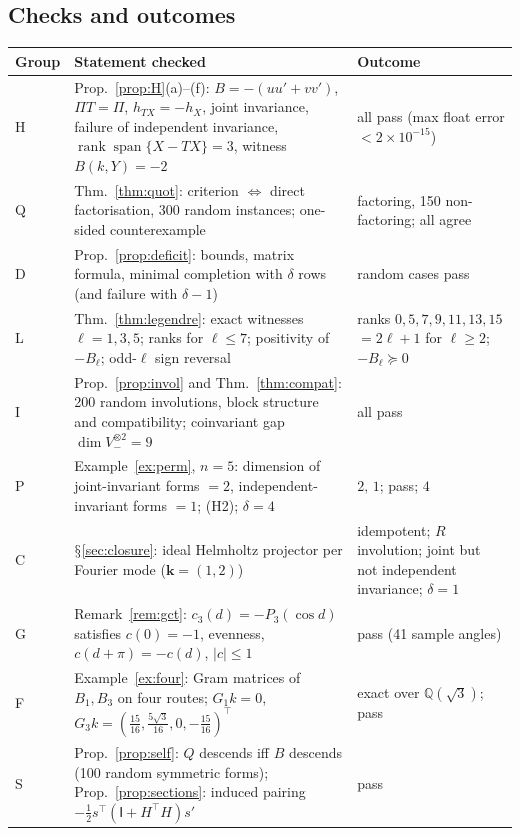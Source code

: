 \documentclass[11pt,a4paper]{article}
\renewcommand{\S}{\ensuremath{\mathsection}}
\newcommand{\rk}{\operatorname{rank}}
\newcommand{\spn}{\operatorname{span}}
\newcommand{\defic}{\delta}
\theoremstyle{plain}
\theoremstyle{definition}
\begin{document}
\subsection{Checks and outcomes}
\begin{table}[t]
\centering\small
\begin{tabularx}{\textwidth}{@{}l>{\raggedright\arraybackslash}X>{\raggedright\arraybackslash}p{}@{}}
\toprule
Group & Statement checked & Outcome\\
\midrule
H & Prop.~\ref{prop:H}(a)--(f): $B=-(uu'+vv')$, $\Pi T=\Pi$, $h_{TX}=-h_X$, joint invariance, failure of independent invariance, $\rk\spn\{X-TX\}=3$, witness $B(k,Y)=-2$ & all pass (max float error $<2\times10^{-15}$)\\
Q & Thm.~\ref{thm:quot}: criterion $\Leftrightarrow$ direct factorisation, 300 random instances; one-sided counterexample & 150 factoring, 150 non-factoring; all agree\\
D & Prop.~\ref{prop:deficit}: bounds, matrix formula, minimal completion with $\defic$ rows (and failure with $\defic-1$) & 300 random cases pass\\
L & Thm.~\ref{thm:legendre}: exact witnesses $\ell=1,3,5$; ranks for $\ell\le7$; positivity of $-B_\ell$; odd-$\ell$ sign reversal & ranks $0,5,7,9,11,13,15$ $=2\ell+1$ for $\ell\ge2$; $-B_\ell\succeq0$\\
I & Prop.~\ref{prop:invol} and Thm.~\ref{thm:compat}: 200 random involutions, block structure and compatibility; coinvariant gap $\dim V_-^{\otimes2}=9$ & all pass\\
P & Example~\ref{ex:perm}, $n=5$: dimension of joint-invariant forms $=2$, independent-invariant forms $=1$; (H2); $\defic=4$ & $2,\,1$; pass; $4$\\
C & \S\ref{sec:closure}: ideal Helmholtz projector per Fourier mode ($\mathbf k=(1,2)$) & idempotent; $R$ involution; joint but not independent invariance; $\defic=1$\\
G & Remark~\ref{rem:gct}: $c_3(d)=-P_3(\cos d)$ satisfies $c(0)=-1$, evenness, $c(d+\pi)=-c(d)$, $|c|\le1$ & pass (41 sample angles)\\
F & Example~\ref{ex:four}: Gram matrices of $B_1,B_3$ on four routes; $G_1k=0$, $G_3k=(\tfrac{15}{16},\tfrac{5\sqrt3}{16},0,-\tfrac{15}{16})^{\!\top}$ & exact over $\mathbb Q(\sqrt3)$; pass\\
S & Prop.~\ref{prop:self}: $Q$ descends iff $B$ descends (100 random symmetric forms); Prop.~\ref{prop:sections}: induced pairing $-\tfrac12s^{\!\top}(\mathsf I+H^{\!\top}H)s'$ & pass\\

\end{tabularx}
\end{table}
\end{document}
